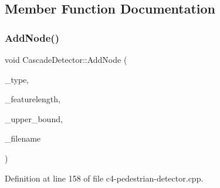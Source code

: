 \subsection{Member Function Documentation}
\mbox{\label{class_cascade_detector_aa8759d8bdb90d648046aa72f0cf0fab3}} 
\subsubsection{\texorpdfstring{Add\+Node()}{AddNode()}}
{\footnotesize\ttfamily void Cascade\+Detector\+::\+Add\+Node (\begin{DoxyParamCaption}\item[{const \mbox{\hyperlink{class_node_detector_a7188c48dfe6b88b3b7f47c599c4832bd}{Node\+Detector\+::\+Node\+Type}}}]{\+\_\+type,  }\item[{const int}]{\+\_\+featurelength,  }\item[{const int}]{\+\_\+upper\+\_\+bound,  }\item[{const char $\ast$}]{\+\_\+filename }\end{DoxyParamCaption})}



Definition at line 158 of file c4-\/pedestrian-\/detector.\+cpp.


